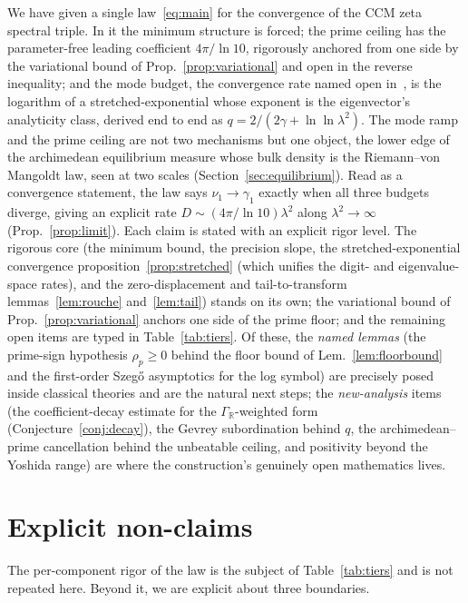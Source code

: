 \documentclass[11pt,a4paper]{article}
\begin{document}
We have given a single law~\eqref{eq:main} for the convergence of the CCM
zeta spectral triple. In it the minimum structure is forced; the prime ceiling
has the parameter-free leading coefficient $4\pi/\ln10$, rigorously anchored
from one side by the variational bound of Prop.~\ref{prop:variational} and
open in the reverse inequality; and the mode budget, the convergence rate
named open in~\cite{CCM2025}, is the logarithm of a stretched-exponential
whose exponent is the eigenvector's analyticity class, derived end to end as
$q=2/(2\gamma+\ln\ln\lambda^2)$. The mode ramp and the prime ceiling are not two
mechanisms but one object, the lower edge of the archimedean equilibrium
measure whose bulk density is the Riemann--von Mangoldt law, seen at two
scales (Section~\ref{sec:equilibrium}). Read as a convergence statement, the law says
$\nu_1\to\gamma_1$ exactly when all three budgets diverge, giving an explicit
rate $D\sim(4\pi/\ln10)\lambda^2$ along $\lambda^2\to\infty$
(Prop.~\ref{prop:limit}). Each claim is stated with an explicit rigor
level. The rigorous core (the minimum bound, the precision slope, the
stretched-exponential convergence proposition~\ref{prop:stretched} (which unifies the
digit- and eigenvalue-space rates), and the zero-displacement and
tail-to-transform lemmas~\ref{lem:rouche} and~\ref{lem:tail}) stands on its
own; the variational bound of
Prop.~\ref{prop:variational} anchors one side of the prime floor; and the
remaining open items are typed in Table~\ref{tab:tiers}. Of these, the
\emph{named lemmas} (the prime-sign hypothesis $\rho_p\ge0$ behind the
floor bound of Lem.~\ref{lem:floorbound} and the first-order Szeg\H{o}
asymptotics for the log symbol)
are precisely posed inside classical theories and are the natural next
steps; the \emph{new-analysis} items (the coefficient-decay estimate for
the $\Gamma_\mathbb{R}$-weighted form (Conjecture~\ref{conj:decay}), the
Gevrey subordination behind $q$,
the archimedean--prime cancellation behind the unbeatable ceiling, and
positivity beyond the Yoshida range) are where the construction's genuinely
open mathematics lives.

\section{Explicit non-claims}\label{sec:nonclaims}

The per-component rigor of the law is the subject of Table~\ref{tab:tiers} and
is not repeated here. Beyond it, we are explicit about three boundaries.
\end{document}

